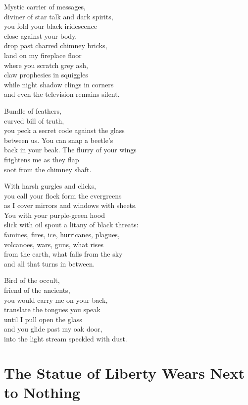 \documentclass[twoside,10pt]{book}
\begin{document}
Mystic carrier of messages,\\
diviner of star talk and dark spirits,\\
you fold your black iridescence\\
close against your body,\\
drop past charred chimney bricks,\\
land on my fireplace floor\\
where you scratch grey ash,\\
claw prophesies in squiggles\\
while night shadow clings in corners\\
and even the television remains silent.

Bundle of feathers,\\
curved bill of truth,\\
you peck a secret code against the glass\\
between us. You can snap a beetle's\\
back in your beak. The flurry of your wings\\
frightens me as they flap\\
soot from the chimney shaft.

With harsh gurgles and clicks,\\
you call your flock form the evergreens\\
as I cover mirrors and windows with sheets.\\
You with your purple-green hood\\
slick with oil spout a litany of black threats:\\
famines, fires, ice, hurricanes, plagues,\\
volcanoes, wars, guns, what rises\\
from the earth, what falls from the sky\\
and all that turns in between.

Bird of the occult,\\
friend of the ancients,\\
you would carry me on your back,\\
translate the tongues you speak\\
until I pull open the glass\\
and you glide past my oak door,\\
into the light stream speckled with dust.


\clearpage
\section{The Statue of Liberty Wears Next to Nothing}
\end{document}
